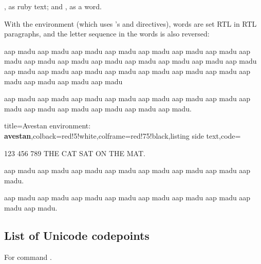 
, as ruby text; and , as a word.


With the  environment 
(which uses 's \codedetok{\pardir} and \codedetok{\textdir} directives),
words are set RTL in RTL paragraphs, and the letter sequence in 
the words is also reversed:%



\begin{avestan}
aap madu aap madu aap madu aap madu aap madu aap madu aap madu aap madu aap madu aap madu aap madu aap madu aap madu aap madu aap madu aap madu aap madu aap madu aap madu aap madu aap madu aap madu aap madu aap madu aap madu aap madu 

aap madu aap madu aap madu aap madu aap madu aap madu aap madu aap madu aap madu aap madu aap madu aap madu aap madu.


\end{avestan}





\bigskip
\begin{tcblisting}{title={{\sffamily Avestan environment: \bfseries\textcolor{blue!10}{avestan}}},colback=red!5!white,colframe=red!75!black,listing side text,code={\marginpar{\p}}}
\begin{avestan}
123 456 789 THE CAT SAT ON THE MAT.

aap madu aap madu aap madu aap madu aap madu aap madu aap madu aap madu.

aap madu aap madu aap madu aap madu aap madu aap madu aap madu aap madu aap madu.
\end{avestan}
\end{tcblisting}





\subsection{List of Unicode codepoints}
For command \codedetok{\avtransuc{}}.
\begin{multicols}{4}\noindent
\avtag
\avshowplainlistuc
\eolist
\end{multicols}

